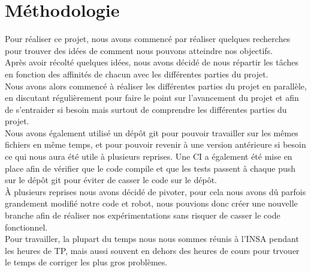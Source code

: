 \chapter{Méthodologie}
    Pour réaliser ce projet, nous avons commencé par réaliser quelques recherches pour trouver des idées de comment nous pouvons atteindre nos objectifs.
    \\
    Après avoir récolté quelques idées, nous avons décidé de nous répartir les tâches en fonction des affinités de chacun avec les différentes parties du projet.
    \\
    Nous avons alors commencé à réaliser les différentes parties du projet en parallèle, en discutant régulièrement pour faire le point sur l'avancement du projet et afin de s'entraider si besoin mais surtout de comprendre les différentes parties du projet.
    \\
    Nous avons également utilisé un dépôt git pour pouvoir travailler sur les mêmes fichiers en même temps, et pour pouvoir revenir à une version antérieure si besoin ce qui nous aura été utile à plusieurs reprises.
    Une CI a également été mise en place afin de vérifier que le code compile et que les tests passent à chaque push sur le dépôt git pour éviter de casser le code sur le dépôt.
    \\
    À plusieurs reprises nous avons décidé de pivoter, pour cela nous avons dû parfois grandement modifié notre code et robot, nous pouvions donc créer une nouvelle branche afin de réaliser nos expérimentations sans risquer de casser le code fonctionnel.
    \\
    Pour travailler, la plupart du temps nous nous sommes réunis à l'INSA pendant les heures de TP, mais aussi souvent en dehors des heures de cours pour trvouer le temps de corriger les plus gros problèmes.
    \\

